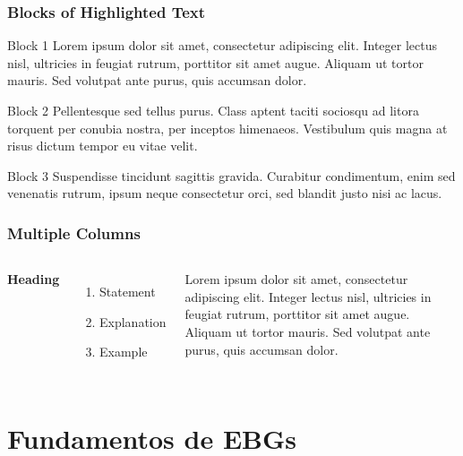\documentclass{beamer}
\begin{document}

\begin{frame}
\frametitle{Blocks of Highlighted Text}
\begin{block}{Block 1}
Lorem ipsum dolor sit amet, consectetur adipiscing elit. Integer lectus nisl, ultricies in feugiat rutrum, porttitor sit amet augue. Aliquam ut tortor mauris. Sed volutpat ante purus, quis accumsan dolor.
\end{block}

\begin{block}{Block 2}
Pellentesque sed tellus purus. Class aptent taciti sociosqu ad litora torquent per conubia nostra, per inceptos himenaeos. Vestibulum quis magna at risus dictum tempor eu vitae velit.
\end{block}

\begin{block}{Block 3}
Suspendisse tincidunt sagittis gravida. Curabitur condimentum, enim sed venenatis rutrum, ipsum neque consectetur orci, sed blandit justo nisi ac lacus.
\end{block}
\end{frame}


\begin{frame}
\frametitle{Multiple Columns}
\begin{columns}[c] %

\textbf{Heading}
\begin{enumerate}
\item Statement
\item Explanation
\item Example
\end{enumerate}

Lorem ipsum dolor sit amet, consectetur adipiscing elit. Integer lectus nisl, ultricies in feugiat rutrum, porttitor sit amet augue. Aliquam ut tortor mauris. Sed volutpat ante purus, quis accumsan dolor.

\end{columns}
\end{frame}




\section{Fundamentos de EBGs}
\end{document}
